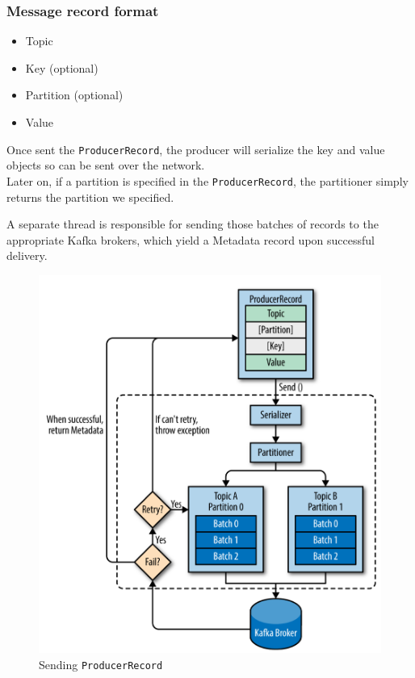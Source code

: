 \newpage
\subsubsection{Message record format}
\begin{paracol}{2}
   \begin{itemize}
      \item Topic
      \item Key  (optional)
      \item Partition  (optional)
      \item Value
   \end{itemize}
   
   Once sent the \texttt{ProducerRecord}, the
   producer will serialize the key and value
   objects so can be sent over the network.\\
   Later on, if a partition is
   specified in the \texttt{ProducerRecord}, the partitioner simply returns the partition we specified.
   
   A separate thread is responsible for sending those batches of records to the appropriate Kafka brokers,
   which yield a Metadata record upon successful delivery.


   \switchcolumn

   \begin{figure}[htbp]
      \centering
      \includegraphics{images/16/producerRecord.png}
      \caption{Sending \texttt{ProducerRecord}}
      \label{fig:16/producerRecord}
   \end{figure}

\end{paracol}


